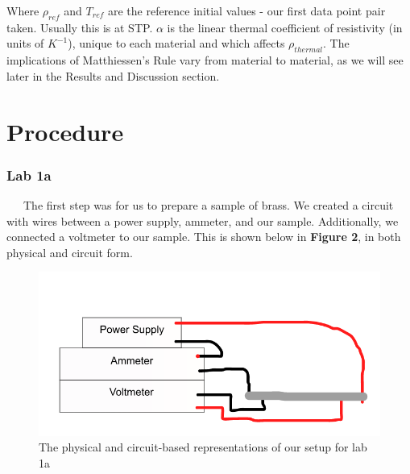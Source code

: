 \documentclass[11pt]{article}
\begin{document}
Where $\rho_{ref}$ and $T_{ref}$ are the reference initial values - our first data point pair taken. Usually this is at STP. $\alpha$ is the linear thermal coefficient of resistivity (in units of $K^{-1}$), unique to each material and which affects $\rho_{thermal}$. The implications of Matthiessen's Rule vary from material to material, as we will see later in the Results and Discussion section.

\section*{Procedure}
\subsubsection*{Lab 1a}
\ \ \ The first step was for us to prepare a sample of brass. We created a circuit with wires between a power supply, ammeter, and our sample. Additionally, we connected a voltmeter to our sample. This is shown below in \textbf{Figure 2}, in both physical and circuit form.

\begin{figure}[h]
	\begin{minipage}{.5\textwidth}
		\centering
		\includegraphics[width=\linewidth]{circuit1.png}
	\end{minipage}
	\begin{minipage}{.5\textwidth}
		\centering
	\end{minipage}
	\caption{The physical and circuit-based representations of our setup for lab 1a}
\end{figure}
\end{document}
